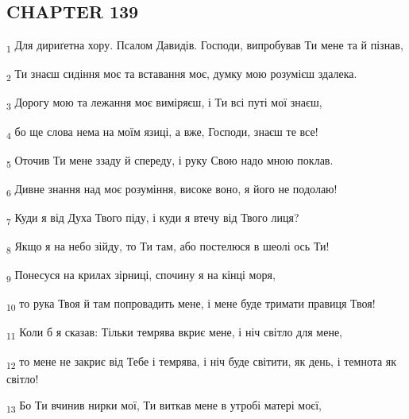 \subsection{CHAPTER 139}
\begin{tcolorbox}
\textsubscript{1} Для дириґетна хору. Псалом Давидів. Господи, випробував Ти мене та й пізнав,
\end{tcolorbox}
\begin{tcolorbox}
\textsubscript{2} Ти знаєш сидіння моє та вставання моє, думку мою розумієш здалека.
\end{tcolorbox}
\begin{tcolorbox}
\textsubscript{3} Дорогу мою та лежання моє виміряєш, і Ти всі путі мої знаєш,
\end{tcolorbox}
\begin{tcolorbox}
\textsubscript{4} бо ще слова нема на моїм язиці, а вже, Господи, знаєш те все!
\end{tcolorbox}
\begin{tcolorbox}
\textsubscript{5} Оточив Ти мене ззаду й спереду, і руку Свою надо мною поклав.
\end{tcolorbox}
\begin{tcolorbox}
\textsubscript{6} Дивне знання над моє розуміння, високе воно, я його не подолаю!
\end{tcolorbox}
\begin{tcolorbox}
\textsubscript{7} Куди я від Духа Твого піду, і куди я втечу від Твого лиця?
\end{tcolorbox}
\begin{tcolorbox}
\textsubscript{8} Якщо я на небо зійду, то Ти там, або постелюся в шеолі ось Ти!
\end{tcolorbox}
\begin{tcolorbox}
\textsubscript{9} Понесуся на крилах зірниці, спочину я на кінці моря,
\end{tcolorbox}
\begin{tcolorbox}
\textsubscript{10} то рука Твоя й там попровадить мене, і мене буде тримати правиця Твоя!
\end{tcolorbox}
\begin{tcolorbox}
\textsubscript{11} Коли б я сказав: Тільки темрява вкриє мене, і ніч світло для мене,
\end{tcolorbox}
\begin{tcolorbox}
\textsubscript{12} то мене не закриє від Тебе і темрява, і ніч буде світити, як день, і темнота як світло!
\end{tcolorbox}
\begin{tcolorbox}
\textsubscript{13} Бо Ти вчинив нирки мої, Ти виткав мене в утробі матері моєї,
\end{tcolorbox}
